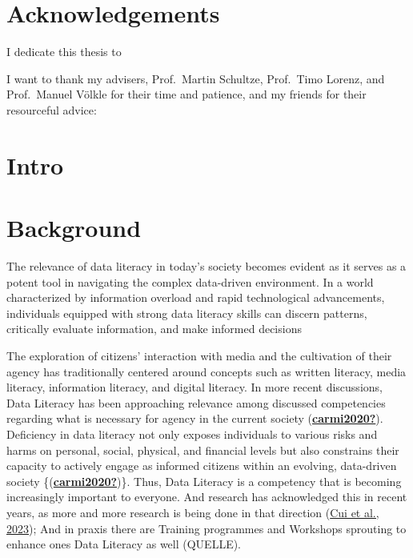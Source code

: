 \documentclass[
  12pt,
  a4paper,
  twoside]{article}
\begin{document}
\hypertarget{acknowledgements}{%
\section*{Acknowledgements}\label{acknowledgements}}

I dedicate this thesis to

I want to thank my advisers, Prof.~Martin Schultze, Prof.~Timo Lorenz, and Prof.~Manuel Völkle for their time and patience, and my friends for their resourceful advice:

\newpage\null\thispagestyle{empty}\newpage

\hypertarget{intro}{%
\section{Intro}\label{intro}}

\hypertarget{background}{%
\section{Background}\label{background}}

The relevance of data literacy in today's society becomes evident as it serves as a potent tool in navigating the complex data-driven environment. In a world characterized by information overload and rapid technological advancements, individuals equipped with strong data literacy skills can discern patterns, critically evaluate information, and make informed decisions

The exploration of citizens' interaction with media and the cultivation of their agency has traditionally centered around concepts such as written literacy, media literacy, information literacy, and digital literacy. In more recent discussions, Data Literacy has been approaching relevance among discussed competencies regarding what is necessary for agency in the current society (\protect\hyperlink{ref-carmi2020}{\textbf{carmi2020?}}). Deficiency in data literacy not only exposes individuals to various risks and harms on personal, social, physical, and financial levels but also constrains their capacity to actively engage as informed citizens within an evolving, data-driven society \{(\protect\hyperlink{ref-carmi2020}{\textbf{carmi2020?}})\}. Thus, Data Literacy is a competency that is becoming increasingly important to everyone. And research has acknowledged this in recent years, as more and more research is being done in that direction (\protect\hyperlink{ref-Cui2023}{Cui et al., 2023}); And in praxis there are Training programmes and Workshops sprouting to enhance ones Data Literacy as well (QUELLE).
\end{document}
